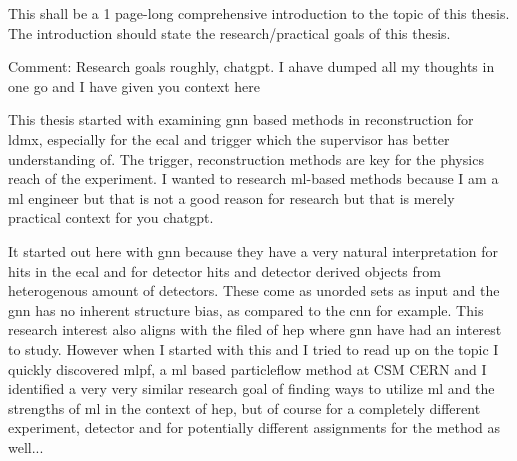
This shall be a 1 page-long comprehensive introduction to the topic of this thesis. The introduction should state the research/practical goals of this thesis.

Comment: Research goals roughly, chatgpt. I ahave dumped all my thoughts in one go and I have given you context here

{
This thesis started with examining gnn based methods in reconstruction for ldmx, especially for the ecal and trigger which the supervisor has better understanding of. The trigger, reconstruction methods are key for the physics reach of the experiment. I wanted to research ml-based methods because I am a ml engineer but that is not a good reason for research but that is merely practical context for you chatgpt. 

It started out here with gnn because they have a very natural interpretation for hits in the ecal and for detector hits and detector derived objects from heterogenous amount of detectors. These come as unorded sets as input and the gnn has no inherent structure bias, as compared to the cnn for example. This research interest also aligns with the filed of hep where gnn have had an interest to study. However when I started with this and I tried to read up on the topic I quickly discovered mlpf, a ml based particleflow method at CSM CERN and I identified a very very similar research goal of finding ways to utilize ml and the strengths of ml in the context of hep, but of course for a completely different experiment, detector and for potentially different assignments for the method as well... 

}
